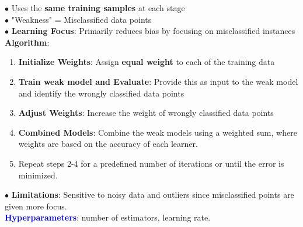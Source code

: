 \documentclass[letterpaper, 10.5pt,landscape]{article}
\begin{document}
\begin{multicols*}{3}
$\bullet$ Uses the \textbf{same training samples} at each stage \\
$\bullet$ "Weakness" =  Misclassified data points \\
$\bullet$ \textbf{Learning Focus}: Primarily reduces bias by focusing on misclassified instances
\textbf{Algorithm}:
\vspace{-3pt}
\begin{enumerate}
    \item \textbf{Initialize Weights}: Assign \textbf{equal weight} to each of the training data 
    \vspace{-3pt}
    \item \textbf{Train weak model and Evaluate}: Provide this as input to the weak model and identify the wrongly classified data points
    \vspace{-3pt}
    \item \textbf{Adjust Weights}: Increase the weight of wrongly classified data points
      \vspace{-3pt}
    \item \textbf{Combined Models}: Combine the weak models using a weighted sum, where weights are based on the accuracy of each learner.
    \vspace{-3pt}
    \item Repeat steps 2-4 for a predefined number of iterations or until the error is minimized.
\end{enumerate}
$\bullet$ \textbf{Limitations}: Sensitive to noisy data and outliers since misclassified points are given more focus. \\

\textbf{\textcolor{blue}{Hyperparameters}}: number of estimators, learning rate.



\end{multicols*}
\end{document}
